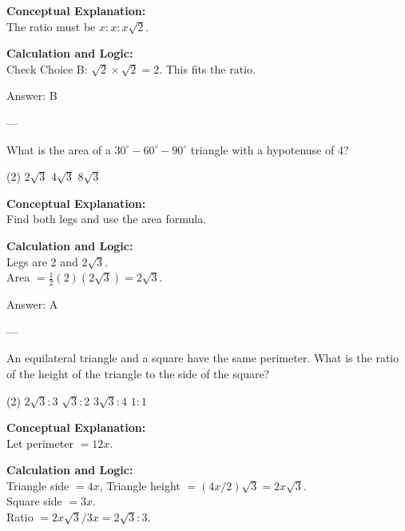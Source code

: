 \documentclass[11pt,paper=a4,answers]{exam}
\begin{document}
\begin{questions}
\begin{solution}
\textbf{Conceptual Explanation:} \\
The ratio must be $x : x : x\sqrt{2}$.

\vspace{10pt}
\textbf{Calculation and Logic:} \\
Check Choice B: $\sqrt{2} \times \sqrt{2} = 2$. This fits the ratio.

\vspace{15pt}
Answer: \colorbox{yellow!100}{B}
\end{solution}

---

\question
What is the area of a $30^\circ-60^\circ-90^\circ$ triangle with a hypotenuse of 4?
\begin{tasks}(2)
    \task $2\sqrt{3}$
    \task $4\sqrt{3}$
    \task $8\sqrt{3}$
\end{tasks}

\begin{solution}
\textbf{Conceptual Explanation:} \\
Find both legs and use the area formula.

\vspace{10pt}
\textbf{Calculation and Logic:} \\
Legs are 2 and $2\sqrt{3}$. \\
Area $= \frac{1}{2}(2)(2\sqrt{3}) = 2\sqrt{3}$.

\vspace{15pt}
Answer: \colorbox{yellow!100}{A}
\end{solution}

---

\question
An equilateral triangle and a square have the same perimeter. What is the ratio of the height of the triangle to the side of the square?
\begin{tasks}(2)
    \task $2\sqrt{3} : 3$
    \task $\sqrt{3} : 2$
    \task $3\sqrt{3} : 4$
    \task $1 : 1$
\end{tasks}

\begin{solution}
\textbf{Conceptual Explanation:} \\
Let perimeter $= 12x$.

\vspace{10pt}
\textbf{Calculation and Logic:} \\
Triangle side $= 4x$, Triangle height $= (4x/2)\sqrt{3} = 2x\sqrt{3}$. \\
Square side $= 3x$. \\
Ratio $= 2x\sqrt{3} / 3x = 2\sqrt{3} : 3$.


\end{solution}
\end{questions}
\end{document}
